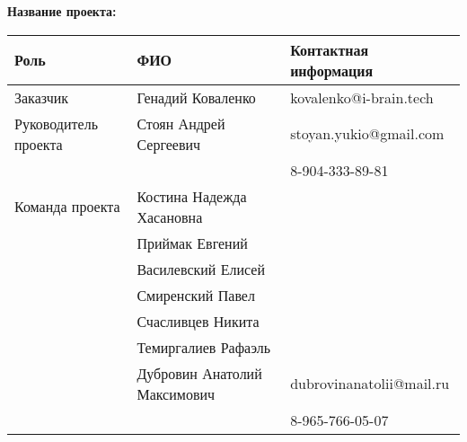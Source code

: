 \documentclass[a4paper,12pt]{article}
\begin{document}
\textbf{Название проекта: }

\vspace{5ex}


\begin{tabular}{|l|l|l|}
    \hline
    \textbf{Роль} & \textbf{ФИО} & \textbf{Контактная информация} \\
    \hline 
    Заказчик & Генадий Коваленко & kovalenko@i-brain.tech \\
    \hline
    Руководитель проекта & Стоян Андрей Сергеевич 
       & stoyan.yukio@gmail.com \\ 
     & & 8-904-333-89-81 \\ 
    \hline
    Команда проекта 
     & Костина Надежда Хасановна & \\ \cline{2-3}
     & Приймак Евгений & \\ \cline{2-3}
     & Василевский Елисей & \\ \cline{2-3}
     & Смиренский Павел & \\ \cline{2-3}
     & Счасливцев Никита & \\ \cline{2-3}
     & Темиргалиев Рафаэль & \\ \cline{2-3}
     & Дубровин Анатолий Максимович
       & dubrovinanatolii@mail.ru \\ 
     & & 8-965-766-05-07 \\
    \hline
\end{tabular}
\end{document}
